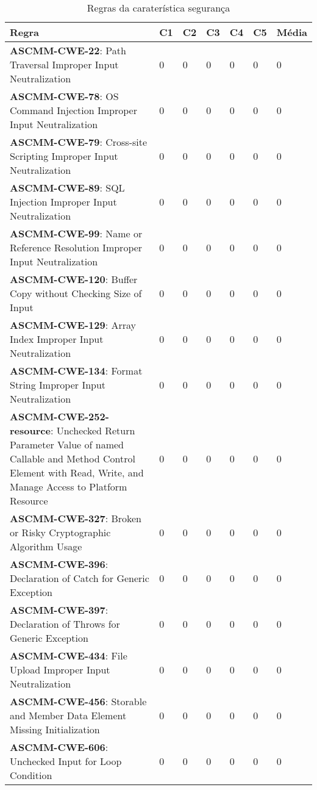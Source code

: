 \documentclass[openany,10pt,a4paper]{article}
\begin{document}
\begin{longtable}
\begin{table}[h]
	\centering
	\caption{Regras da caraterística segurança}
	\begin{tabular}{|p{3in}|p{0.3in}|p{0.3in}|p{0.3in}|p{0.3in}|p{0.3in}|p{0.4in}|}
		\hline	
		\textbf{Regra} & \textbf{C1} & \textbf{C2} & \textbf{C3} & \textbf{C4} & \textbf{C5} & \textbf{Média} \\ \hline
		\textbf{ASCMM-CWE-22}: Path Traversal Improper Input Neutralization & 0 & 0 & 0 & 0 & 0 & 0 \\ \hline
		\textbf{ASCMM-CWE-78}: OS Command Injection Improper Input Neutralization & 0 & 0 & 0 & 0 & 0 & 0 \\ \hline
		\textbf{ASCMM-CWE-79}: Cross-site Scripting Improper Input Neutralization & 0 & 0 & 0 & 0 & 0 & 0 \\ \hline
		\textbf{ASCMM-CWE-89}: SQL Injection Improper Input Neutralization & 0 & 0 & 0 & 0 & 0 & 0 \\ \hline
		\textbf{ASCMM-CWE-99}: Name or Reference Resolution Improper Input Neutralization & 0 & 0 & 0 & 0 & 0 & 0 \\ \hline
		\textbf{ASCMM-CWE-120}: Buffer Copy without Checking Size of Input & 0 & 0 & 0 & 0 & 0 & 0 \\ \hline
		\textbf{ASCMM-CWE-129}: Array Index Improper Input Neutralization & 0 & 0 & 0 & 0 & 0 & 0 \\ \hline
		\textbf{ASCMM-CWE-134}: Format String Improper Input Neutralization & 0 & 0 & 0 & 0 & 0 & 0 \\ \hline
		\textbf{ASCMM-CWE-252-resource}: Unchecked Return Parameter Value of named Callable and Method Control Element with Read, Write, and Manage Access to Platform Resource & 0 & 0 & 0 & 0 & 0 & 0 \\ \hline
		\textbf{ASCMM-CWE-327}: Broken or Risky Cryptographic Algorithm Usage & 0 & 0 & 0 & 0 & 0 & 0 \\ \hline
		\textbf{ASCMM-CWE-396}: Declaration of Catch for Generic Exception & 0 & 0 & 0 & 0 & 0 & 0 \\ \hline
		\textbf{ASCMM-CWE-397}: Declaration of Throws for Generic Exception & 0 & 0 & 0 & 0 & 0 & 0 \\ \hline
		\textbf{ASCMM-CWE-434}: File Upload Improper Input Neutralization & 0 & 0 & 0 & 0 & 0 & 0 \\ \hline
		\textbf{ASCMM-CWE-456}: Storable and Member Data Element Missing Initialization & 0 & 0 & 0 & 0 & 0 & 0 \\ \hline
		\textbf{ASCMM-CWE-606}: Unchecked Input for Loop Condition & 0 & 0 & 0 & 0 & 0 & 0 \\ \hline

\end{tabular}
\end{table}
\end{longtable}
\end{document}
